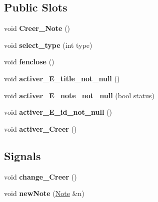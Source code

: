 \subsection*{Public Slots}
\begin{DoxyCompactItemize}
\item 
\mbox{\label{class_creation___note_a533d14d9799dfb6257de99778d38a8ba}} 
void {\bfseries Creer\+\_\+\+Note} ()
\item 
\mbox{\label{class_creation___note_a4627e5957db87af2b7c43937857e9d6e}} 
void {\bfseries select\+\_\+type} (int type)
\item 
\mbox{\label{class_creation___note_a280ec768b1c2b99bdf885089c32c0134}} 
void {\bfseries fenclose} ()
\item 
\mbox{\label{class_creation___note_a2b9c2eabbcff615f1f02f092a4706295}} 
void {\bfseries activer\+\_\+\+E\+\_\+title\+\_\+not\+\_\+null} ()
\item 
\mbox{\label{class_creation___note_a55a85cdf537406058368bbdb3d3e8ed1}} 
void {\bfseries activer\+\_\+\+E\+\_\+note\+\_\+not\+\_\+null} (bool status)
\item 
\mbox{\label{class_creation___note_abe23b774f4d9964f6d745d4c1d6e1621}} 
void {\bfseries activer\+\_\+\+E\+\_\+id\+\_\+not\+\_\+null} ()
\item 
\mbox{\label{class_creation___note_a07b8f673a499c2cf3b47ff990b7c80ef}} 
void {\bfseries activer\+\_\+\+Creer} ()
\end{DoxyCompactItemize}
\subsection*{Signals}
\begin{DoxyCompactItemize}
\item 
\mbox{\label{class_creation___note_ac077793d8161d266c9d500c6545da80e}} 
void {\bfseries change\+\_\+\+Creer} ()
\item 
\mbox{\label{class_creation___note_a51d4541fbf18ccb297ce5f15da3a6cab}} 
void {\bfseries new\+Note} (\hyperlink{class_note}{Note} \&n)
\end{DoxyCompactItemize}
